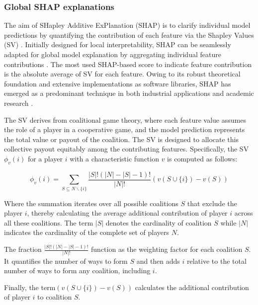 \subsubsection{Global SHAP explanations}
\label{chap2_shap}

The aim of SHapley Additive ExPlanation (SHAP) is to clarify individual model predictions by quantifying the contribution of each feature via the Shapley Values (SV) \cite{Shapley1953AGames}. Initially designed for local interpretability, \gls{SHAP} can be seamlessly adapted for global model explanation by aggregating individual feature contributions \cite{Lundberg2020FromTrees.}. The most used \gls{SHAP}-based score to indicate feature contribution is the absolute average of SV for each feature. Owing to its robust theoretical foundation and extensive implementations as software libraries, \gls{SHAP} has emerged as a predominant technique in both industrial applications and academic research \cite{Bhatt2020ExplainableDeployment}.

The SV derives from coalitional game theory, where each feature value assumes the role of a player in a cooperative game, and the model prediction represents the total value or payout of the coalition. The SV is designed to allocate this collective payout equitably among the contributing features. Specifically, the SV $\phi_v(i)$ for a player $i$ with a characteristic function $v$ is computed as follows: 

\begin{equation}
\phi_v(i) = \sum_{S \subseteq N \backslash \{i\}} \frac{|S|! \left( |N| - |S| - 1 \right)!}{|N|!} \left( v\left( S \cup \{i\} \right) - v(S) \right)
\end{equation}

Where the summation iterates over all possible coalitions $S$ that exclude the player \(i\), thereby calculating the average additional contribution of player $i$ across all these coalitions. The term $|S|$ denotes the cardinality of coalition $S$ while $|N|$ indicates the cardinality of the complete set of players $N$. 

The fraction $\frac{|S|! \left( |N| - |S| - 1 \right)!}{|N|!}$ function as the weighting factor for each coalition $S$. It quantifies the number of ways to form $S$ and then adds $i$ relative to the total number of ways to form any coalition, including $i$. 

Finally,  the term$\left( v\left( S \cup \{i\} \right) - v(S) \right)$ calculates the additional contribution of player $i$ to coalition $S$. 

